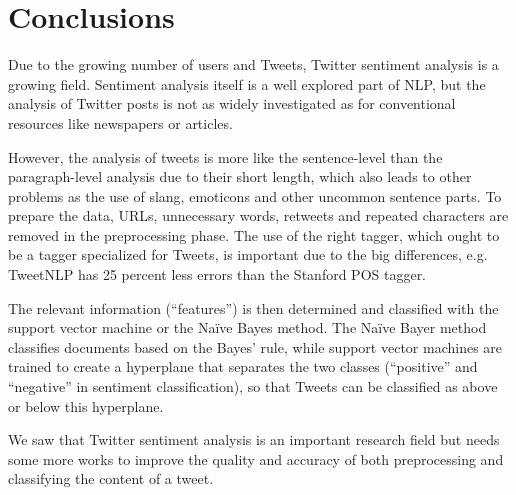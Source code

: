 \section{Conclusions}
Due to the growing number of users and Tweets, Twitter sentiment analysis is a growing field. Sentiment analysis itself is a well explored part of NLP, but the analysis of Twitter posts is not as widely investigated as for conventional resources like newspapers or articles. 

However, the analysis of tweets is more like the sentence-level than the paragraph-level analysis due to their short length, which also leads to other problems as the use of slang, emoticons and other uncommon sentence parts. To prepare the data, URLs, unnecessary words, retweets and repeated characters are removed in the preprocessing phase. The use of the right tagger, which ought to be a tagger specialized for Tweets, is important due to the big differences, e.g. TweetNLP has 25 percent less errors than the Stanford POS tagger. 

The relevant information (``features'') is then determined and classified with the support vector machine or the Na\"ive Bayes method. The Na\"ive Bayer method classifies documents based on the Bayes' rule, while support vector machines are trained to create a hyperplane that separates the two classes (``positive'' and ``negative'' in sentiment classification), so that Tweets can be classified as above or below this hyperplane.

We saw that Twitter sentiment analysis is an important research field but needs some more works to improve the quality and accuracy of both preprocessing and classifying the content of a tweet.
